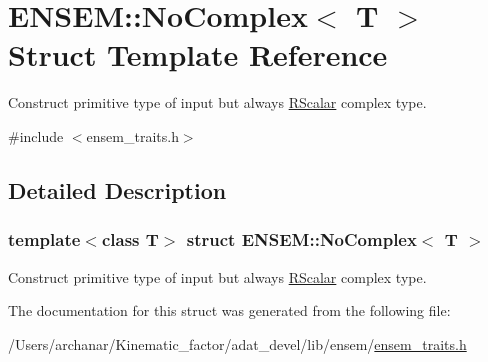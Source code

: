 \hypertarget{structENSEM_1_1NoComplex}{}\section{E\+N\+S\+EM\+:\+:No\+Complex$<$ T $>$ Struct Template Reference}
\label{structENSEM_1_1NoComplex}


Construct primitive type of input but always \mbox{\hyperlink{classENSEM_1_1RScalar}{R\+Scalar}} complex type.  




{\ttfamily \#include $<$ensem\+\_\+traits.\+h$>$}



\subsection{Detailed Description}
\subsubsection*{template$<$class T$>$\newline
struct E\+N\+S\+E\+M\+::\+No\+Complex$<$ T $>$}

Construct primitive type of input but always \mbox{\hyperlink{classENSEM_1_1RScalar}{R\+Scalar}} complex type. 

The documentation for this struct was generated from the following file\+:\begin{DoxyCompactItemize}
\item 
/\+Users/archanar/\+Kinematic\+\_\+factor/adat\+\_\+devel/lib/ensem/\mbox{\hyperlink{lib_2ensem_2ensem__traits_8h}{ensem\+\_\+traits.\+h}}\end{DoxyCompactItemize}
